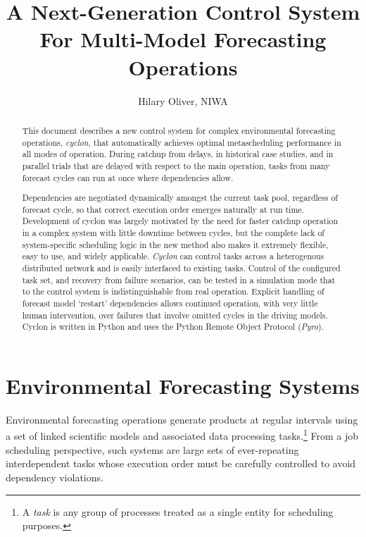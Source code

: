 \documentclass[11pt,a4paper]{article}
\title{A Next-Generation Control System For Multi-Model Forecasting Operations}
\author{Hilary Oliver, NIWA}
\begin{document}
\maketitle

\pagebreak
\tableofcontents
\pagebreak

\begin{abstract}

This document describes a new control system for complex environmental
forecasting operations, {\em cyclon}, that automatically achieves
optimal metascheduling performance in all modes of operation. During
catchup from delays, in historical case studies, and in parallel trials
that are delayed with respect to the main operation, tasks from many
forecast cycles can run at once where dependencies allow. 

Dependencies are negotiated dynamically amongst the current task pool,
regardless of forecast cycle, so that correct execution order emerges
naturally at run time. Development of cyclon was largely motivated by
the need for faster catchup operation in a complex system with little
downtime between cycles, but the complete lack of system-specific
scheduling logic in the new method also makes it extremely flexible,
easy to use, and widely applicable. {\em Cyclon} can control tasks
across a heterogenous distributed network and is easily interfaced to
existing tasks. Control of the configured task set, and recovery from
failure scenarios, can be tested in a simulation mode that to the
control system is indistinguishable from real operation. Explicit
handling of forecast model `restart' dependencies allows continued
operation, with very little human intervention, over failures that
involve omitted cycles in the driving models. Cyclon is written in
Python and uses the Python Remote Object Protocol ({\em Pyro}).

\end{abstract}


\section{Environmental Forecasting Systems}

Environmental forecasting operations generate products at regular
intervals using a set of linked scientific models and associated data
processing tasks.\footnote{A {\em task} is any group of processes
treated as a single entity for scheduling purposes.}  From a job
scheduling perspective, such systems are large sets of ever-repeating
interdependent tasks whose execution order must be carefully controlled
to avoid dependency violations.  
\end{document}
